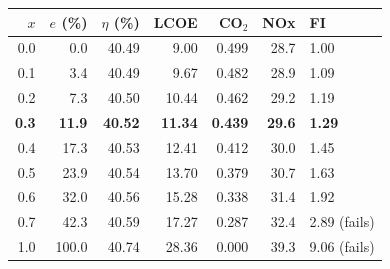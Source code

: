 \begin{tabular}{@{}rrrrrrl@{}}\toprule $x$ & $e$ (\%) & $\eta$ (\%) & LCOE & CO$_2$ & NOx & FI \\\midrule
0.0 & 0.0 & 40.49 & 9.00 & 0.499 & 28.7 & 1.00\\
0.1 & 3.4 & 40.49 & 9.67 & 0.482 & 28.9 & 1.09\\
0.2 & 7.3 & 40.50 & 10.44 & 0.462 & 29.2 & 1.19\\
\textbf{0.3} & \textbf{11.9} & \textbf{40.52} & \textbf{11.34} & \textbf{0.439} & \textbf{29.6} & \textbf{1.29}\\
0.4 & 17.3 & 40.53 & 12.41 & 0.412 & 30.0 & 1.45\\
0.5 & 23.9 & 40.54 & 13.70 & 0.379 & 30.7 & 1.63\\
0.6 & 32.0 & 40.56 & 15.28 & 0.338 & 31.4 & 1.92\\
0.7 & 42.3 & 40.59 & 17.27 & 0.287 & 32.4 & 2.89 (fails)\\
1.0 & 100.0 & 40.74 & 28.36 & 0.000 & 39.3 & 9.06 (fails)\\
\bottomrule\end{tabular}